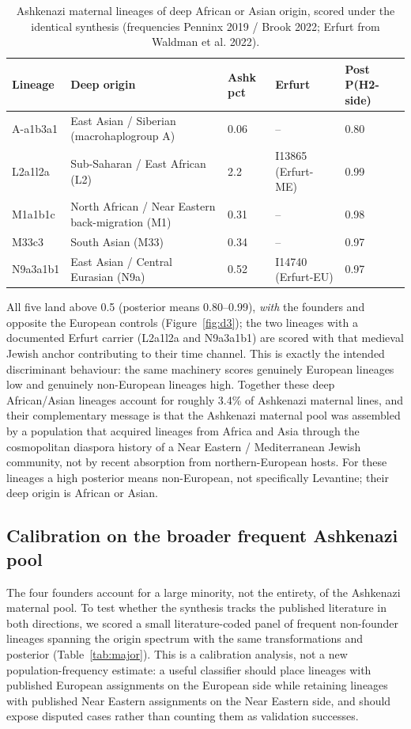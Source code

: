 \documentclass[11pt]{article}
\begin{document}
\begin{table}[htbp]
\centering
\footnotesize
\caption{Ashkenazi maternal lineages of deep African or Asian origin, scored under the identical synthesis (frequencies Penninx 2019 / Brook 2022; Erfurt from Waldman et al. 2022).}
\label{tab:noneur}
\begin{tabular}{lllll}
\toprule
Lineage & Deep origin & Ashk pct & Erfurt & Post P(H2-side) \\
\midrule
A-a1b3a1 & East Asian / Siberian (macrohaplogroup A) &  0.06 & -- & 0.80 \\
L2a1l2a & Sub-Saharan / East African (L2) &   2.2 & I13865 (Erfurt-ME) & 0.99 \\
M1a1b1c & North African / Near Eastern back-migration (M1) &  0.31 & -- & 0.98 \\
M33c3 & South Asian (M33) &  0.34 & -- & 0.97 \\
N9a3a1b1 & East Asian / Central Eurasian (N9a) &  0.52 & I14740 (Erfurt-EU) & 0.97 \\
\bottomrule
\end{tabular}
\end{table}
All five land above 0.5 (posterior means 0.80--0.99), \emph{with} the founders and opposite the European controls (Figure~\ref{fig:d3}); the two lineages with a documented Erfurt carrier (L2a1l2a and N9a3a1b1) are scored with that medieval Jewish anchor contributing to their time channel. This is exactly the intended discriminant behaviour: the same machinery scores genuinely European lineages low and genuinely non-European lineages high. Together these deep African/Asian lineages account for roughly 3.4\% of Ashkenazi maternal lines, and their complementary message is that the Ashkenazi maternal pool was assembled by a population that acquired lineages from Africa and Asia through the cosmopolitan diaspora history of a Near Eastern / Mediterranean Jewish community, not by recent absorption from northern-European hosts. For these lineages a high posterior means non-European, not specifically Levantine; their deep origin is African or Asian.

\subsection{Calibration on the broader frequent Ashkenazi pool}
The four founders account for a large minority, not the entirety, of the Ashkenazi maternal pool. To test whether the synthesis tracks the published literature in both directions, we scored a small literature-coded panel of frequent non-founder lineages spanning the origin spectrum with the same transformations and posterior (Table~\ref{tab:major}). This is a calibration analysis, not a new population-frequency estimate: a useful classifier should place lineages with published European assignments on the European side while retaining lineages with published Near Eastern assignments on the Near Eastern side, and should expose disputed cases rather than counting them as validation successes.
\end{document}
